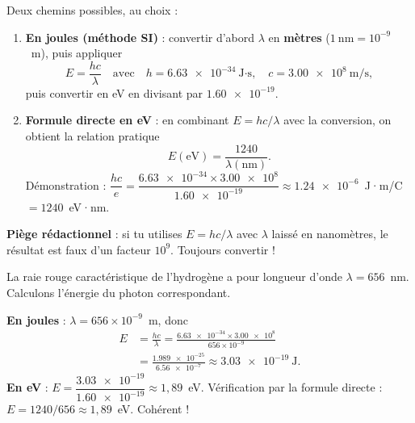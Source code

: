 \documentclass[11pt]{article}
\begin{document}
\begin{methode}
Deux chemins possibles, au choix :
\begin{enumerate}
\item \textbf{En joules (méthode SI)} : convertir d'abord $\lambda$ en \textbf{mètres} ($1~\text{nm} = 10^{-9}$~m), puis appliquer
\[ E = \frac{hc}{\lambda} \quad \text{avec} \quad h = \num{6,63e-34}~\text{J·s}, \quad c = \num{3,00e8}~\text{m/s}, \]
puis convertir en eV en divisant par $\num{1,60e-19}$.
\item \textbf{Formule directe en eV} : en combinant $E = hc/\lambda$ avec la conversion, on obtient la relation pratique
\[ E(\text{eV}) = \frac{1240}{\lambda(\text{nm})}. \]
Démonstration : $\dfrac{hc}{e} = \dfrac{\num{6,63e-34} \times \num{3,00e8}}{\num{1,60e-19}} \approx \num{1,24e-6}$~J·m/C $= 1240$~eV·nm.
\end{enumerate}
\textbf{Piège rédactionnel} : si tu utilises $E = hc/\lambda$ avec $\lambda$ laissé en nanomètres, le résultat est faux d'un facteur $10^{9}$. Toujours convertir !
\end{methode}

\begin{exemplebox}
La raie rouge caractéristique de l'hydrogène a pour longueur d'onde $\lambda = 656$~nm. Calculons l'énergie du photon correspondant.

\textbf{En joules} : $\lambda = 656 \times 10^{-9}$~m, donc
\begin{align*}
E &= \frac{hc}{\lambda} = \frac{\num{6,63e-34} \times \num{3,00e8}}{656 \times 10^{-9}} \\
&= \frac{\num{1,989e-25}}{\num{6,56e-7}} \approx \num{3,03e-19}~\text{J}.
\end{align*}
\textbf{En eV} : $E = \dfrac{\num{3,03e-19}}{\num{1,60e-19}} \approx 1,89$~eV. Vérification par la formule directe : $E = 1240/656 \approx 1,89$~eV. Cohérent !
\end{exemplebox}
\end{document}

